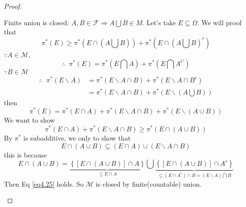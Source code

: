 \begin{proof}
\begin{enumerate}
\begin{enumerate}
			Finite union is closed: $ A,B \in \mathcal{F} \Rightarrow A\bigcup {B \in M}. $ Let's take $E \subseteq \Omega $. We will proof that
			\begin{equation}
			{\pi ^*}\left( E \right) \geqslant {\pi ^*}\left( {E \cap \left( {A\bigcup B } \right)} \right) + {\pi ^*}\left( {E \cap {{\left( {A\bigcup B } \right)}^c}} \right)
			\label{eq4.25}
			\end{equation}
			$\because A \in \mathcal{M}$,
			\begin{equation}
			\therefore \;\;{\pi ^*}\left( E \right) = {\pi ^*}\left( {E\bigcap A } \right) + {\pi ^*}\left( {E\bigcap {{A^C}} } \right)
			\label{eq4.26}
			\end{equation}
			$\because B \in \mathcal{M}$
			\begin{equation}
			\begin{split}
			\therefore \;\;{\pi ^*}\left( {E\backslash A} \right) & = {\pi ^*}\left( {E\backslash A \cap B} \right) + {\pi ^*}\left( {E\backslash A \cap {B^c}} \right) \\
																& = {\pi ^*}\left( {E\backslash A \cap B} \right) + {\pi ^*}\left( {E\backslash \left( {A\bigcup B } \right)} \right)
			\end{split}
			\label{eq4.27}
			\end{equation}
			then 
			\begin{equation}
			{\pi ^*}\left( E \right) = {\pi ^*}\left( {E \cap A} \right) + {\pi ^*}\left( {E\backslash A \cap B} \right) + {\pi ^*}\left( {E\backslash \left( {A \cup B} \right)} \right)
			\label{eq4.28}
			\end{equation}
			We want to show
			\begin{equation}
			{\pi ^*}\left( {E \cap A} \right) + {\pi ^*}\left( {E\backslash A \cap B} \right) \geqslant {\pi ^*}\left( {E \cap \left( {A \cup B} \right)} \right)
			\label{eq4.29}
			\end{equation}
			By ${\pi ^*}$ is subadditive, we only to show that 
			\begin{equation}
			E \cap \left( {A \cup B} \right) \subseteq \left( {E \cap A} \right) \cup \left( {E\backslash A \cap B} \right)
			\label{eq4.30}
			\end{equation}
			this is because
			\begin{equation}
			E \cap \left( {A \cup B} \right) = \underbrace {\left\{ {\left[ {E \cap \left( {A \cup B} \right)} \right] \cap A} \right\}}_{ \subseteq E \cap A}\bigcup {\underbrace {\left\{ {\left[ {E \cap \left( {A \cup B} \right)} \right] \cap {A^c}} \right\}}_{ \subseteq \left( {E \cap {A^c}} \right) \cap B = \left( {E\backslash A} \right)\bigcap B }} 
			\label{eq4.31}
			\end{equation}
			Then Eq \ref{eq4.25} holds. So $ \mathcal{M} $ is closed by finite(countable) union.
			

\end{enumerate}
\end{enumerate}
\end{proof}
